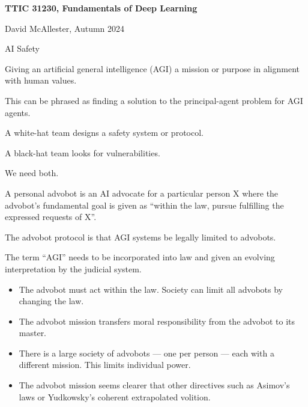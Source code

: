 




{\Huge

\centerline{\bf TTIC 31230, Fundamentals of Deep Learning}

\bigskip
\centerline{David McAllester, Autumn  2024}

\vfill
\centerline{AI Safety}

\vfill\vfill


Giving an artificial general intelligence (AGI) a mission or purpose in alignment with human values.

\vfill
This can be phrased as finding a solution to the principal-agent problem for AGI agents.


A white-hat team designs a safety system or protocol.

\vfill
A black-hat team looks for vulnerabilities.

\vfill
We need both.


A personal advobot is an AI advocate for a particular person X where the advobot's fundamental goal is given as ``within the law, pursue fulfilling the expressed requests of X''.

\vfill
The advobot protocol is that AGI systems be legally limited to advobots.

\vfill
The term ``AGI'' needs to be incorporated into law and given an evolving interpretation by the judicial system.


\begin{itemize}
\item The advobot must act within the law. Society can limit all advobots by changing the law.

\vfill
\item The advobot mission transfers moral responsibility from the advobot to its master.

\vfill
\item There is a large society of advobots --- one per person --- each with a different mission.  This limits individual power.

\vfill
\item The advobot mission seems clearer that other directives such as Asimov’s laws or Yudkowsky's coherent extrapolated volition.


\end{itemize}}
